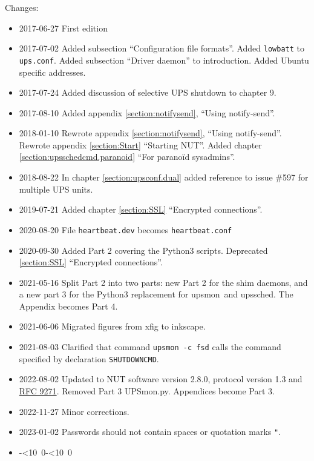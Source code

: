\documentclass[12pt]{article}
\def\isodate{\leavevmode\hbox{\the\year-\twodigits\month-\twodigits\day}}
\def\twodigits#1{\ifnum#1<10 0\fi\the#1}
\newcommand{\newcolumn}{\vfill\eject}
\newcommand{\upsmon}{\mbox{\textcolor{MONCOLOUR}{upsmon}}}
\newcommand{\upssched}{\mbox{\textcolor{SCHEDCOLOUR}{upssched}}}
\newcommand{\notifysend}{\mbox{\textcolor{NOTIFYCOLOUR}{notify-send}}}
\newcommand{\upsconf}{\textcolor{UPSDCOLOUR}{\texttt{ups.conf}}}
\newcommand{\RFCnumber}{9271}
\newcommand{\RFCshort}{\href{https://www.rfc-editor.org/info/rfc\RFCnumber}%
                            {RFC \RFCnumber}}
\newcommand{\ul}{\begin{itemize}%
   \setlength{\itemsep}{0em}}
\newcommand{\eul}{\end{itemize}}
\newcommand{\li}{\item}                 %
\begin{document}
\vspace*{\fill}
Changes:  

\ul

\li 2017-06-27 First edition 

\li 2017-07-02 Added subsection ``Configuration file formats''.  Added
\texttt{lowbatt} to \upsconf.  Added subsection ``Driver daemon'' to
introduction.  Added Ubuntu specific addresses.

\li 2017-07-24 Added discussion of selective UPS shutdown to chapter 9.

\li 2017-08-10 Added appendix \ref{section:notifysend}, ``Using \notifysend''.

\li 2018-01-10 Rewrote appendix \ref{section:notifysend}, ``Using \notifysend''.
Rewrote appendix \ref{section:Start} ``Starting NUT''.
Added chapter \ref{section:upsschedcmd.paranoid} ``For parano\"id sysadmins''.

\li 2018-08-22 In chapter \ref{section:upsconf.dual} added reference
to issue \#597 for multiple UPS units.

\li 2019-07-21 Added chapter \ref{section:SSL} ``Encrypted connections''.

\li 2020-08-20 File \texttt{heartbeat.dev} becomes \texttt{heartbeat.conf}

\li 2020-09-30 Added Part 2 covering the Python3 scripts. Deprecated
\ref{section:SSL} ``Encrypted connections''.

\li 2021-05-16 Split Part 2 into two parts: new Part 2 for the shim daemons,
and a new part 3 for the Python3 replacement for \upsmon\ and \upssched. The
Appendix becomes Part 4.

\li 2021-06-06 Migrated figures from xfig to inkscape.

\li 2021-08-03 Clarified that command \texttt{upsmon -c fsd} calls the
command specified by declaration \texttt{SHUTDOWNCMD}.

\li 2022-08-02 Updated to NUT software version 2.8.0, protocol version
1.3 and \RFCshort.  Removed Part 3 UPSmon.py.  Appendices become Part 3.

\li 2022-11-27 Minor corrections.

\li 2023-01-02 Passwords should not contain spaces or quotation marks
\texttt{"}.

\li \isodate

\eul

\vspace*{\fill}
\newcolumn
\tableofcontents
\listoffigures

\end{document}
